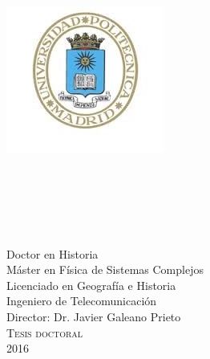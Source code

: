 \documentclass[
11pt, %
spanish, %
onehalfspacing, %
]{MastersDoctoralThesis_custom} %
\author{Francisco Javier \textsc{García Algarra}} %
\begin{document}
\frontmatter %

\pagestyle{plain} %

\begin{titlepage}
\begin{center}
\includegraphics[scale=0.6]{Figures/logoupm.jpg}

\textsc{\Large \univname}\\
\textsc{\large \deptname}\\
\textsc{\large \groupname}\\[4.0cm] %

{\huge \textsc \ttitle}\\[5cm] %
{\Large \authorname}\\[0.15cm]
\small Doctor en Historia\\
\small Máster en Física de Sistemas Complejos\\
\small Licenciado en Geografía e Historia\\
\small Ingeniero de Telecomunicación\\[1.0cm] 
\Large{{Director: }{Dr. Javier Galeano Prieto}}\\[1cm]
\textsc{\Large Tesis doctoral}\\[0.5cm] %
{\large 2016}\\[4cm] %
 
\vfill
\end{center}
\end{titlepage}


\end{document}
